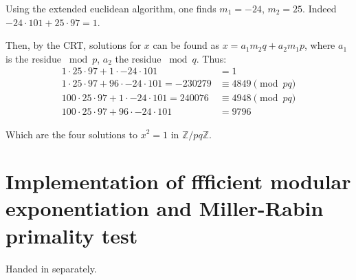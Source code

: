 \documentclass[a4paper]{scrreprt}
\begin{document}
Using the extended euclidean algorithm, one finds $m_1 = -24$, $m_2 = 25$.
Indeed $-24 \cdot 101 + 25 \cdot 97 = 1$.

Then, by the CRT, solutions for $x$ can be found as $x = a_1 m_2 q + a_2 m_1 p$,
where $a_1$ is the residue $\bmod p$, $a_2$ the residue $\bmod q$. Thus:
\begin{align*}
		1 \cdot 25 \cdot 97 + 1 \cdot -24 \cdot 101 & = 1 \\
		1 \cdot 25 \cdot 97 + 96 \cdot -24 \cdot 101 = -230279 & \equiv 4849 \pmod{pq} \\
		100 \cdot 25 \cdot 97 + 1 \cdot -24 \cdot 101 = 240076 & \equiv 4948 \pmod {pq} \\
		100 \cdot 25 \cdot 97 + 96 \cdot -24 \cdot 101 & = 9796
\end{align*}

Which are the four solutions to $x^2 = 1$ in $\mathbb{Z} / pq \mathbb{Z}$.

\section{Implementation of ffficient modular exponentiation and Miller-Rabin primality test}

Handed in separately.
\end{document}
